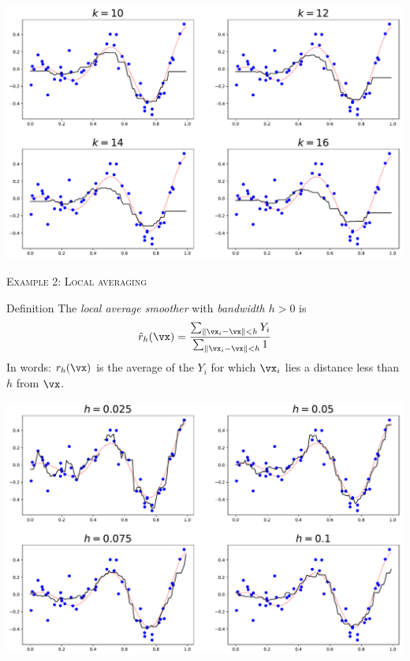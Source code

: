 \documentclass{beamer}
\begin{document}
\begin{frame}{}%
    \includegraphics[scale=0.36]{knn_four_plots_2.pdf}
\end{frame}


\begin{frame}{\textsc{Example 2: Local averaging}}

\begin{block}{Definition}
    The \emph{local average smoother} with \emph{bandwidth $h>0$} is
    \[
        \hat r_h(\vx) = \frac{\sum_{\|\vx_i - \vx\|< h}Y_i}{\sum_{\|\vx_i - \vx\|< h}1}
    \]
    In words: $r_h(\vx)$ is the average of the $Y_i$ for which $\vx_i$
    lies a distance less than $h$ from $\vx$.
\end{block}
\end{frame}

\begin{frame}{}%
    \includegraphics[scale=0.36]{la_four_plots_1.pdf}
\end{frame}
\end{document}
